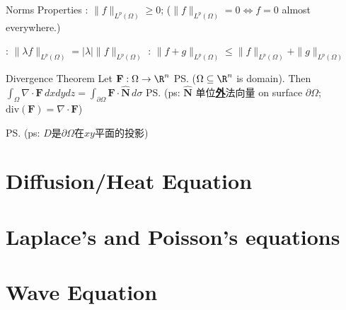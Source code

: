 \documentclass{note}
\begin{document}
\begin{MyTh}{Norms Properties}
    : $\|f\|_{L^p(\Omega)}\ge 0$; {\footnotesize ($\|f\|_{L^p(\Omega)}=0\Leftrightarrow f=0$ almost everywhere.)}
    
    \hspace{87pt} : $\|\lambda f\|_{L^p(\Omega)}=|\lambda|\|f\|_{L^p(\Omega)}$ \quad {}: $\|f+g\|_{L^p(\Omega)}\le \|f\|_{L^p(\Omega)}+\|g\|_{L^p(\Omega)}$
\end{MyTh}

\begin{MyTh}{Divergence Theorem}
    Let $\mathbf{F}:\Omega\to\R^n$ \ps{($\Omega\subseteq\R^n$ is domain)}. Then $\int_\Omega \nabla \cdot \mathbf{F} \, dxdydz = \int_{\partial \Omega} \mathbf{F} \cdot \widehat{\mathbf{N}} \, d\sigma$ \quad \ps{(ps: $\widehat{\mathbf{N}}$ 单位\textbf{\underline{外}}法向量 on surface $\partial \Omega$; $\text{div}(\mathbf{F})=\nabla \cdot \mathbf{F}$)}

     \quad \ps{(ps: $D$是$\partial\Omega$在$xy$平面的投影)}
\end{MyTh}


\section{Diffusion/Heat Equation}


\section{Laplace's and Poisson's equations}


\section{Wave Equation}
\end{document}
